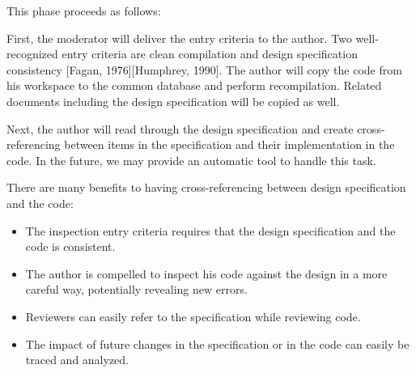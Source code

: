 \noindent This phase proceeds as follows:

First, the moderator will deliver the entry criteria to the author.
Two well-recognized entry criteria are clean compilation and design 
specification consistency [Fagan, 1976][Humphrey, 1990].
The author will copy the code from his workspace to the common database
and perform recompilation. Related documents including the design
specification will be copied as well.

Next, the author will read through the design specification and
create cross-referencing between items
in the specification and their  implementation in the code.
In the future, we may provide an automatic tool to handle this task.

\noindent There are many benefits to having  cross-referencing between design
specification and the code:
\begin {itemize}
\item The inspection entry criteria requires that the design specification
and the code is consistent.
\item The author is compelled to inspect his code against the design
in a more careful way, potentially revealing new errors.
\item Reviewers can easily refer to the specification while reviewing
code.
\item The impact of future changes in the specification or in the code
can easily be traced and analyzed.
\end {itemize}

